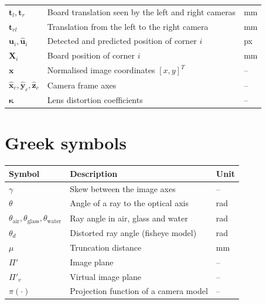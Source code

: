 \begin{tabularx}{\textwidth}{@{}l X U@{}}
$\mathbf{t}_l, \mathbf{t}_r$         & Board translation seen by the left and right cameras & mm \\
$\mathbf{t}_{rl}$                    & Translation from the left to the right camera        & mm \\
$\mathbf{u}_i, \hat{\mathbf{u}}_i$   & Detected and predicted position of corner $i$        & px \\
$\mathbf{X}_i$                       & Board position of corner $i$                         & mm \\
$\mathbf{x}$                         & Normalised image coordinates $[x, y]^T$              & -- \\
$\hat{\mathbf{x}}_c, \hat{\mathbf{y}}_c, \hat{\mathbf{z}}_c$ & Camera frame axes        & -- \\
$\bm{\kappa}$                        & Lens distortion coefficients                         & -- \\
\bottomrule
\end{tabularx}

\section*{Greek symbols}
\noindent
\begin{tabularx}{\textwidth}{@{}l X U@{}}
\toprule
\textbf{Symbol} & \textbf{Description} & \textbf{Unit} \\
\midrule
$\gamma$                           & Skew between the image axes                         & -- \\
$\theta$                           & Angle of a ray to the optical axis                  & rad \\
$\theta_\text{air}, \theta_\text{glass}, \theta_\text{water}$ & Ray angle in air, glass and water & rad \\
$\theta_d$                         & Distorted ray angle (fisheye model)                 & rad \\
$\mu$                              & Truncation distance                                 & mm \\
$\Pi'$                             & Image plane                                         & -- \\
$\Pi'_v$                           & Virtual image plane                                 & -- \\
$\pi(\cdot)$                       & Projection function of a camera model               & -- \\
\bottomrule
\end{tabularx}

